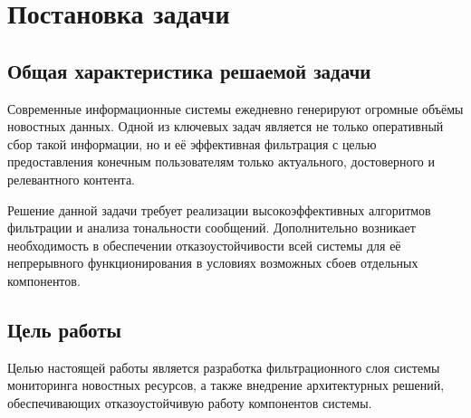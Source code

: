 \newpage

\section{Постановка задачи}

\subsection{Общая характеристика решаемой задачи}
Современные информационные системы ежедневно генерируют огромные объёмы новостных данных.
Одной из ключевых задач является не только оперативный сбор такой информации, но и её эффективная фильтрация с целью предоставления конечным пользователям только актуального, достоверного и релевантного контента.

Решение данной задачи требует реализации высокоэффективных алгоритмов фильтрации и анализа тональности сообщений.
Дополнительно возникает необходимость в обеспечении отказоустойчивости всей системы для её непрерывного функционирования в условиях возможных сбоев отдельных компонентов.

\subsection{Цель работы}
Целью настоящей работы является разработка фильтрационного слоя системы мониторинга новостных ресурсов, а также внедрение архитектурных решений, обеспечивающих отказоустойчивую работу компонентов системы.

